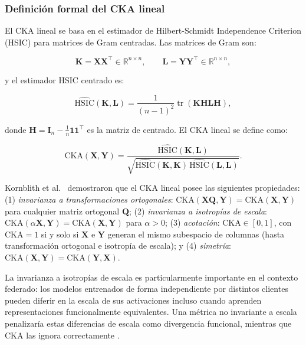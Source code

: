 \subsubsection{Definición formal del CKA lineal}

El CKA lineal se basa en el estimador de Hilbert-Schmidt Independence Criterion (HSIC) para
matrices de Gram centradas. Las matrices de Gram son:

\begin{equation}
  \mathbf{K} = \mathbf{X}\mathbf{X}^\top \in \mathbb{R}^{n \times n}, \qquad
  \mathbf{L} = \mathbf{Y}\mathbf{Y}^\top \in \mathbb{R}^{n \times n},
  \label{eq:gram}
\end{equation}

y el estimador HSIC centrado es:

\begin{equation}
  \widehat{\text{HSIC}}(\mathbf{K}, \mathbf{L}) =
  \frac{1}{(n-1)^2} \operatorname{tr}(\mathbf{K}\mathbf{H}\mathbf{L}\mathbf{H}),
  \label{eq:hsic}
\end{equation}

donde $\mathbf{H} = \mathbf{I}_n - \frac{1}{n}\mathbf{1}\mathbf{1}^\top$ es la matriz de
centrado. El CKA lineal se define como:

\begin{equation}
  \text{CKA}(\mathbf{X}, \mathbf{Y}) =
  \frac{\widehat{\text{HSIC}}(\mathbf{K}, \mathbf{L})}
  {\sqrt{\widehat{\text{HSIC}}(\mathbf{K}, \mathbf{K})\,
         \widehat{\text{HSIC}}(\mathbf{L}, \mathbf{L})}}.
  \label{eq:cka}
\end{equation}

\sloppy Kornblith et al.\ \cite{DBLP:journals/corr/abs-1905-00414} demostraron que el CKA lineal
posee las siguientes propiedades: (1) \textit{invarianza a transformaciones ortogonales}:
$\text{CKA}(\mathbf{X}\mathbf{Q}, \mathbf{Y}) = \text{CKA}(\mathbf{X}, \mathbf{Y})$ para
cualquier matriz ortogonal $\mathbf{Q}$; (2) \textit{invarianza a isotropías de escala}:
$\text{CKA}(\alpha\mathbf{X}, \mathbf{Y}) = \text{CKA}(\mathbf{X}, \mathbf{Y})$ para
$\alpha > 0$; (3) \textit{acotación}: $\text{CKA} \in [0, 1]$, con $\text{CKA} = 1$ si y
solo si $\mathbf{X}$ e $\mathbf{Y}$ generan el mismo subespacio de columnas (hasta
transformación ortogonal e isotropía de escala); y (4) \textit{simetría}: $\text{CKA}
(\mathbf{X}, \mathbf{Y}) = \text{CKA}(\mathbf{Y}, \mathbf{X})$.

La invarianza a isotropías de escala es particularmente importante en el contexto federado:
los modelos entrenados de forma independiente por distintos clientes pueden diferir en la
escala de sus activaciones incluso cuando aprenden representaciones funcionalmente equivalentes.
Una métrica no invariante a escala penalizaría estas diferencias de escala como divergencia
funcional, mientras que CKA las ignora correctamente \cite{DBLP:journals/corr/abs-1905-00414}.

